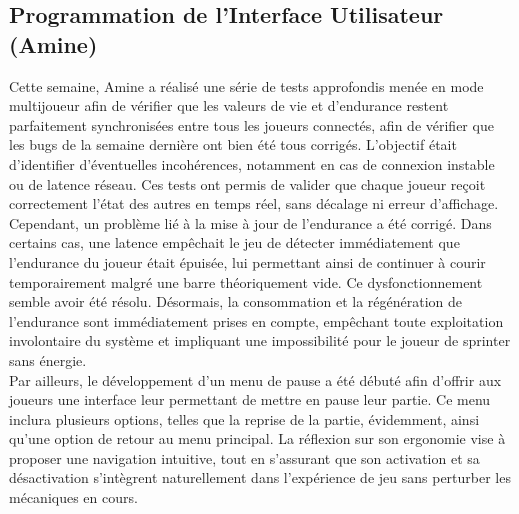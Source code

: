 \documentclass{report}
\begin{document}
\subsection*{Programmation de l'Interface Utilisateur (Amine)}
Cette semaine, Amine a réalisé une série de tests approfondis menée en mode multijoueur afin de vérifier que les valeurs de vie et d’endurance restent parfaitement synchronisées entre tous les joueurs connectés, afin de vérifier que les bugs de la semaine dernière ont bien été tous corrigés. L’objectif était d’identifier d’éventuelles incohérences, notamment en cas de connexion instable ou de latence réseau. Ces tests ont permis de valider que chaque joueur reçoit correctement l’état des autres en temps réel, sans décalage ni erreur d’affichage. Cependant, un problème lié à la mise à jour de l’endurance a été corrigé. Dans certains cas, une latence empêchait le jeu de détecter immédiatement que l’endurance du joueur était épuisée, lui permettant ainsi de continuer à courir temporairement malgré une barre théoriquement vide. Ce dysfonctionnement semble avoir été résolu. Désormais, la consommation et la régénération de l’endurance sont immédiatement prises en compte, empêchant toute exploitation involontaire du système et impliquant une impossibilité pour le joueur de sprinter sans énergie.
\\[0.4cm]
Par ailleurs, le développement d’un menu de pause a été débuté afin d’offrir aux joueurs une interface leur permettant de mettre en pause leur partie. Ce menu inclura plusieurs options, telles que la reprise de la partie, évidemment, ainsi qu’une option de retour au menu principal. La réflexion sur son ergonomie vise à proposer une navigation intuitive, tout en s’assurant que son activation et sa désactivation s’intègrent naturellement dans l’expérience de jeu sans perturber les mécaniques en cours.

\newpage %
\end{document}
